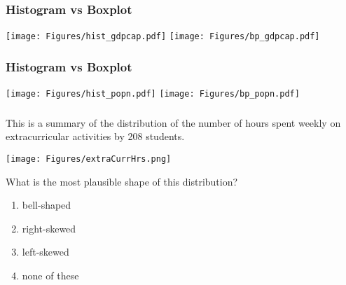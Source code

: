 \begin{frame}
\frametitle{Histogram vs Boxplot}
\texttt{[image: Figures/hist\_gdpcap.pdf]}
\texttt{[image: Figures/bp\_gdpcap.pdf]}
\end{frame}


\begin{frame}
\frametitle{Histogram vs Boxplot}
\texttt{[image: Figures/hist\_popn.pdf]}
\texttt{[image: Figures/bp\_popn.pdf]}
\end{frame}


\begin{frame}
\frametitle{\grp}
This is a summary of the distribution of the number of hours spent weekly on extracurricular activities by 208 students.
\begin{center}
\texttt{[image: Figures/extraCurrHrs.png]}
\end{center}
\begin{clicker}{What is the most plausible shape of this distribution?}
\begin{enumerate}
    \item
    bell-shaped
    \item
    right-skewed
    \item
    left-skewed
    \item
    none of these
\end{enumerate}
\end{clicker}
\end{frame}



